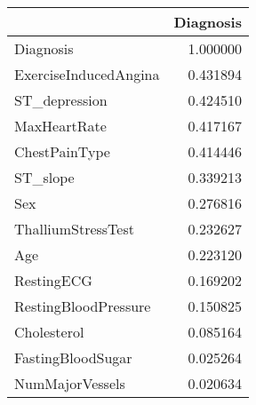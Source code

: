 \begin{tabular}{lr}
\toprule
{} &  Diagnosis \\
\midrule
Diagnosis             &   1.000000 \\
ExerciseInducedAngina &   0.431894 \\
ST\_depression         &   0.424510 \\
MaxHeartRate          &   0.417167 \\
ChestPainType         &   0.414446 \\
ST\_slope              &   0.339213 \\
Sex                   &   0.276816 \\
ThalliumStressTest    &   0.232627 \\
Age                   &   0.223120 \\
RestingECG            &   0.169202 \\
RestingBloodPressure  &   0.150825 \\
Cholesterol           &   0.085164 \\
FastingBloodSugar     &   0.025264 \\
NumMajorVessels       &   0.020634 \\
\bottomrule
\end{tabular}
